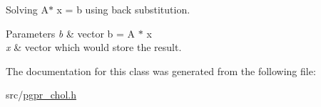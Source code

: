Solving A$\ast$ x = b using back substitution. 


\begin{DoxyParams}{Parameters}
{\em b} & vector b = A $\ast$ x \\
\hline
{\em x} & vector which would store the result. \\
\hline
\end{DoxyParams}


The documentation for this class was generated from the following file\+:\begin{DoxyCompactItemize}
\item 
src/\hyperlink{pgpr__chol_8h}{pgpr\+\_\+chol.\+h}\end{DoxyCompactItemize}
